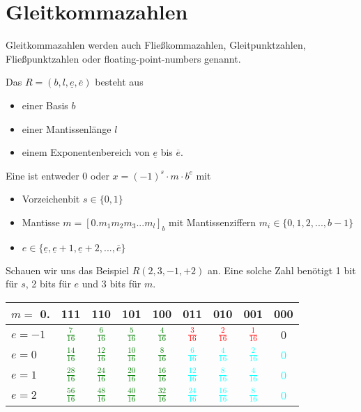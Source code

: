 \section{Gleitkommazahlen}

Gleitkommazahlen werden auch Fließkommazahlen, Gleitpunktzahlen, Fließpunktzahlen oder floating-point-numbers genannt.

Das  $R=(b,l,\underline{e},\overline{e})$ besteht aus
\begin{itemize}
	\item einer Basis $b$
	\item einer Mantissenlänge $l$
	\item einem Exponentenbereich von $\underline{e}$ bis $\overline{e}$.
\end{itemize}

Eine  ist entweder 0 oder $x=(-1)^s\cdot m\cdot b^e$ mit
\begin{itemize}
	\item Vorzeichenbit $s\in \{0,1\}$
	\item Mantisse $m=[0.m_1m_2m_3...m_l]_b$ mit Mantissenziffern $m_i\in\{0,1,2,...,b-1\}$
	\item $e\in\{\underline{e},\underline{e}+1,\underline{e}+2,...,\overline{e}\}$
\end{itemize}

Schauen wir uns das Beispiel $R(2,3,-1,+2)$ an. Eine solche Zahl benötigt 1 bit für $s$, 2 bits für $e$ und 3 bits für $m$.
\begin{center}
	\begin{tabular}{l|cccccccc}
		$m=$\textbf{ 0.} & \textbf{111} & \textbf{110} & \textbf{101} & \textbf{100} & \textbf{011} & \textbf{010} & \textbf{001} & \textbf{000} \\
		\hline
		$e=-1$ & \textcolor{Green}{$\frac{7}{16}$} & \textcolor{Green}{$\frac{6}{16}$} & \textcolor{Green}{$\frac{5}{16}$} & \textcolor{Green}{$\frac{4}{16}$} & \textcolor{red}{$\frac{3}{16}$} & \textcolor{red}{$\frac{2}{16}$} & \textcolor{red}{$\frac{1}{16}$} & 0 \\
		$e=0$ & \textcolor{Green}{$\frac{14}{16}$} & \textcolor{Green}{$\frac{12}{16}$} & \textcolor{Green}{$\frac{10}{16}$} & \textcolor{Green}{$\frac{8}{16}$} & \textcolor{Cyan}{$\frac{6}{16}$} & \textcolor{Cyan}{$\frac{4}{16}$} & \textcolor{Cyan}{$\frac{2}{16}$} & \textcolor{Cyan}{0} \\
		$e=1$ & \textcolor{Green}{$\frac{28}{16}$} & \textcolor{Green}{$\frac{24}{16}$} & \textcolor{Green}{$\frac{20}{16}$} & \textcolor{Green}{$\frac{16}{16}$} & \textcolor{Cyan}{$\frac{12}{16}$} & \textcolor{Cyan}{$\frac{8}{16}$} & \textcolor{Cyan}{$\frac{4}{16}$} & \textcolor{Cyan}{0} \\
		$e=2$ & \textcolor{Green}{$\frac{56}{16}$} & \textcolor{Green}{$\frac{48}{16}$} & \textcolor{Green}{$\frac{40}{16}$} & \textcolor{Green}{$\frac{32}{16}$} & \textcolor{Cyan}{$\frac{24}{16}$} & \textcolor{Cyan}{$\frac{16}{16}$} & \textcolor{Cyan}{$\frac{8}{16}$} & \textcolor{Cyan}{0} \\
	\end{tabular}
\end{center}

